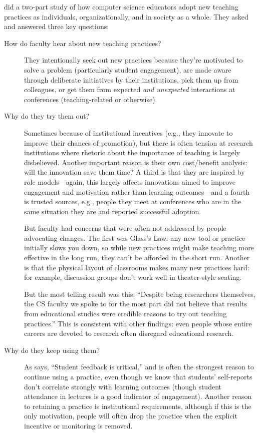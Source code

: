 \cite{Bark2015} did a two-part study of how computer science educators adopt new teaching practices
as individuals, organizationally, and in society as a whole.
They asked and answered three key questions:

\begin{description}

\item[How do faculty hear about new teaching practices?]
  They intentionally seek out new practices
  because they're motivated to solve a problem (particularly student engagement),
  are made aware through deliberate initiatives by their institutions,
  pick them up from colleagues,
  or get them from expected \emph{and unexpected} interactions at conferences
  (teaching-related or otherwise).

\item[Why do they try them out?]
  Sometimes because of institutional incentives
  (e.g., they innovate to improve their chances of promotion),
  but there is often tension at research institutions
  where rhetoric about the importance of teaching is largely disbelieved.
  Another important reason is their own cost/benefit analysis:
  will the innovation save them time?
  A third is that they are inspired by role models---again,
  this largely affects innovations aimed to improve engagement and motivation
  rather than learning outcomes---and a fourth is trusted sources,
  e.g.,
  people they meet at conferences who are in the same situation they are
  and reported successful adoption.

  But faculty had concerns that were often not addressed by people advocating changes.
  The first was Glass's Law:
  any new tool or practice initially slows you down,
  so while new practices might make teaching more effective in the long run,
  they can't be afforded in the short run.
  Another is that the physical layout of classrooms makes many new practices hard:
  for example,
  discussion groups don't work well in theater-style seating.

  But the most telling result was this:
  ``Despite being researchers themselves,
  the CS faculty we spoke to for the most part did not believe that
  results from educational studies were credible reasons to try out teaching practices.''
  This is consistent with other findings:
  even people whose entire careers are devoted to research often disregard educational research.

\item[Why do they keep using them?]
  As \cite{Bark2015} says, ``Student feedback is critical,''
  and is often the strongest reason to continue using a practice,
  even though we know that students' self-reports don't correlate strongly with learning outcomes \cite{Star2014,Uttl2017}
  (though student attendance in lectures is a good indicator of engagement).
  Another reason to retaining a practice is institutional requirements,
  although if this is the only motivation,
  people will often drop the practice
  when the explicit incentive or monitoring is removed.

\end{description}

